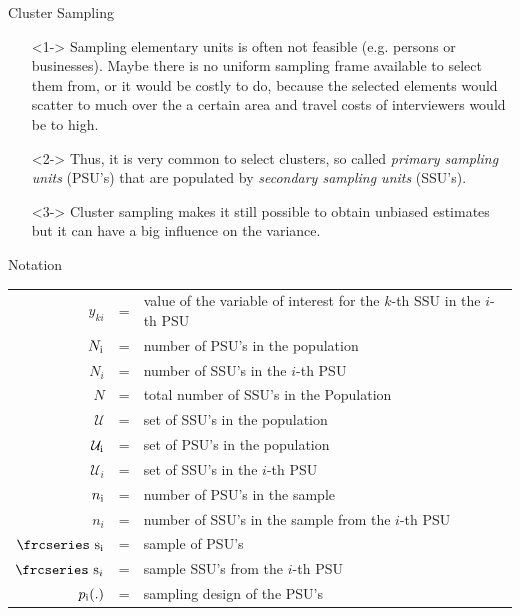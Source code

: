 \documentclass[10pt]{beamer}\usepackage[]{graphicx}\usepackage[]{color}
\newcommand{\textfrc}[1]{{\frcseries#1}}
\newcommand{\mathfrc}[1]{\text{\textfrc{#1}}}
\newcommand{\RN}[1]{%
  \textup{\uppercase\expandafter{\romannumeral#1}}%
}
\begin{document}
\begin{frame}{Cluster Sampling}
\begin{itemize}
\item[]<1-> Sampling elementary units is often not feasible (e.g. persons or businesses). Maybe there is no uniform sampling frame available to select them from, or it would be costly to do, because the selected elements would scatter to much over the a certain area and travel costs of interviewers would be to high. 

\item[]<2-> Thus, it is very common to select clusters, so called \emph{primary sampling units} (PSU's) that are populated by \emph{secondary sampling units} (SSU's).

\item[]<3-> Cluster sampling makes it still possible to obtain unbiased estimates but it can have a big influence on the variance. 
\end{itemize}

\end{frame}


\begin{frame}{Notation}
\begin{tabular}{rcp{8cm}}
$y_{ki}$      &=&value of the variable of interest for the $k$-th SSU in the $i$-th PSU \\
$N_{\RN{1}}$     &=&number of PSU's in the population \\
$N_i$       &=&number of SSU's in the $i$-th PSU \\
$N$         &=&total number of SSU's in the Population \\
$\mathcal{U}$  &=& set of SSU's in the population \\
$\mathcal{U}_{\RN{1}} $  &=& set of PSU's in the population \\
$\mathcal{U}_i$  &=& set of SSU's in the $i$-th PSU \\
$n_{\RN{1}}$         &=&number of PSU's in the sample \\
$n_i$   &=&number of SSU's in the sample from the $i$-th PSU\\
$\mathfrc{s}_{\RN{1}}$  &=& sample of PSU's \\
$\mathfrc{s}_i$         &=& sample SSU's from the $i$-th PSU \\ 
$p_{\RN{1}}(.)$         &=& sampling design of the PSU's \\
\end{tabular}

\end{frame}
\end{document}
